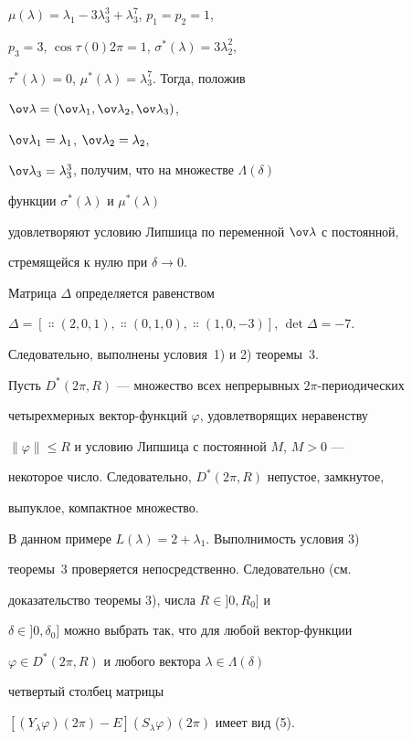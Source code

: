 $\mu(\lambda)=\lambda_1-3\lambda^3_3+\lambda^7_3$, $p_1=p_2=1$, 


$p_3=3$, $\cos\tau(0)2\pi=1$, $\sigma^*(\lambda)=3\lambda^2_2$, 


$\tau^*(\lambda)=0$, $\mu^*(\lambda)=\lambda^7_3$. Тогда, положив 


$\ov\lambda=(\ov\lambda_1,\ov\lambda_2,\ov\lambda_3)$, 


$\ov\lambda_1=\lambda_1$, $\ov\lambda_2=\lambda_2$, 


$\ov\lambda_3=\lambda^3_3$, получим, что на множестве $\Lambda(\delta)$ 


функции $\sigma^*(\lambda)$ и $\mu^*(\lambda)$ 


удовлетворяют условию Липшица по переменной $\ov\lambda$ с постоянной, 


стремящейся к нулю при $\delta\to0$. 


 


Матрица $\Delta$ определяется равенством 


$\Delta=[\Colon(2,0,1),\Colon(0,1,0),\Colon(1,0,-3)]$, $\det\Delta=-7$. 


Следовательно, выполнены условия~1) и 2) теоремы~3. 


 


Пусть $D^*(2\pi,R)$ --- множество всех непрерывных $2\pi$-периодических 


четырехмерных вектор-функций $\varphi$, удовлетворящих неравенству 


$\|\varphi\|\le R$ и условию Липшица с постоянной $M$, $M>0$ --- 


некоторое число. Следовательно, $D^*(2\pi,R)$ непустое, замкнутое, 


выпуклое, компактное множество. 


 


В данном примере $L(\lambda)=2+\lambda_1$. Выполнимость условия 3) 


теоремы~3 проверяется непосредственно. Следовательно (см. 


доказательство теоремы 3), числа $R\in]0,R_0]$ и 


$\delta\in]0,\delta_0]$ можно выбрать так, что для любой вектор-функции 


$\varphi\in D^*(2\pi,R)$ и любого вектора $\lambda\in\Lambda(\delta)$ 


четвертый столбец матрицы 


$[(Y_\lambda\varphi)(2\pi)-E](S_\lambda\varphi)(2\pi)$ имеет вид (5). 


